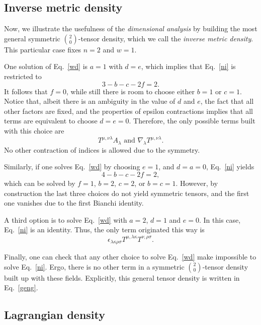 \subsection{Inverse metric density}

Now, we illustrate the usefulness of the \emph{dimensional analysis} by building the most general symmetric $\binom{2}{0}$-tensor density, which we call the \emph{inverse metric density}. This particular case fixes $n = 2$ and $w = 1$.

One solution of Eq.~\eqref{wd} is $a=1$ with $d=e$, which implies that Eq.~\eqref{ni} is restricted to
\begin{equation*}
  3 - b - c - 2f = 2.
\end{equation*}
It follows that $f=0$, while still there is room to choose either $b=1$ or $c=1$. Notice that, albeit there is an ambiguity in the value of $d$ and $e$, the fact that all other factors are fixed, and the properties of epsilon contractions implies that all terms are equivalent to choose $d=e=0$. Therefore, the only possible terms built with this choice are
\begin{equation}
  T^{\mu,\nu\lambda} A_\lambda \text{ and } \nabla_\lambda T^{\mu,\nu\lambda}.
\end{equation}
No other contraction of indices is allowed due to the symmetry.

Similarly, if one solves Eq.~\eqref{wd} by choosing $e=1$, and $d=a=0$, Eq.~\eqref{ni} yields
\begin{equation*}
  4 - b - c - 2f = 2,
\end{equation*}
which can be solved by $f=1$, $b=2$, $c=2$, or $b=c=1$. However, by construction the last three choices do not yield symmetric tensors, and the first one vanishes due to the first Bianchi identity.

A third option is to solve Eq.~\eqref{wd} with $a=2$, $d=1$ and $e=0$. In this case, Eq.~\eqref{ni} is an identity. Thus, the only term originated this way is 
\begin{equation}
  \epsilon_{\lambda\kappa\rho\sigma} T^{\mu, \lambda\kappa} T^{\nu, \rho\sigma}.
\end{equation}

Finally, one can check that any other choice to solve Eq.~\eqref{wd} make impossible to solve Eq.~\eqref{ni}. Ergo, there is no other term in a symmetric $\binom{2}{0}$-tensor density built up with these fields. Explicitly, this general tensor density is written in Eq.~\eqref{geng}.

\subsection{Lagrangian density}


